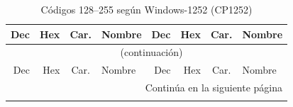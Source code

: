 \documentclass[12pt,twoside]{book}
\begin{document}
					\small
					\begin{longtable}{r r c l r r c l}
						\caption{Códigos 128--255 según Windows-1252 (CP1252)}
						\label{tab:cp1252-128-255}\\
						\hline
						Dec & Hex & Car. & Nombre & Dec & Hex & Car. & Nombre \\
						\hline
						\endfirsthead
						
						\multicolumn{8}{c}{\small\tablename\ \thetable\ (continuación)}\\
						\hline
						Dec & Hex & Car. & Nombre & Dec & Hex & Car. & Nombre \\
						\hline
						\endhead
						
						\hline
						\multicolumn{8}{r}{\small Continúa en la siguiente página}\\
						\endfoot
						
						\hline
						\endlastfoot
						

\end{longtable}
\end{document}
